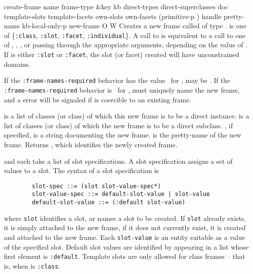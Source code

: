 \begin{okbcop}{create-frame}{ name frame-type \&key kb direct-types direct-superclasses doc template-slots template-facets own-slots own-facets (primitive-p \true) handle pretty-name kb-local-only-p} { new-frame } { O } { W } {  }
Creates a new frame called  of type .
    is one of \{{\tt :class}, {\tt :slot}, {\tt :facet},
   {\tt :individual}\}.  A call to  is equivalent to
   a call to one of , ,
   , or  passing through the appropriate
   arguments, depending on the value of .  If
    is either {\tt :slot} or {\tt :facet}, the slot
   (or facet) created will have unconstrained domains.

   If the {\tt :frame-names-required} behavior has the value \false\ for
   ,  may be \false.  If the
   {\tt :frame-names-required} behavior is \true\ for ,
    must uniquely name the new frame, and a
    error will be signaled if 
   is coercible to an existing frame.

    is a list of classes (or class) of which this new
   frame is to be a direct instance.
    is a list of classes (or class) of which the
   new frame is to be a direct subclass.
   , if specified, is a string documenting the new frame.
    is the pretty-name of the new frame.  Returns
   , which identifies the newly created frame.

    and  each take a list of slot 
   specifications.  A slot specification assigns a set of values to a
   slot.  The syntax of a slot specification is
   \begin{verbatim}
        slot-spec ::= (slot slot-value-spec*)
        slot-value-spec ::= default-slot-value | slot-value
        default-slot-value ::= (:default slot-value)
   \end{verbatim}
   where {\tt slot} identifies a slot, or names a slot to be created.  If
   {\tt slot} already exists, it is simply attached to the new frame, if
   it does not currently exist, it is created and attached to the new frame.
   Each {\tt slot-value} is an entity suitable as a value of
   the specified slot.  Default slot values are identified by appearing in
   a list whose first element is {\tt :default}.  Template slots are only
   allowed for class frames -- that is, when  is
   {\tt :class}.
   

\end{okbcop}
